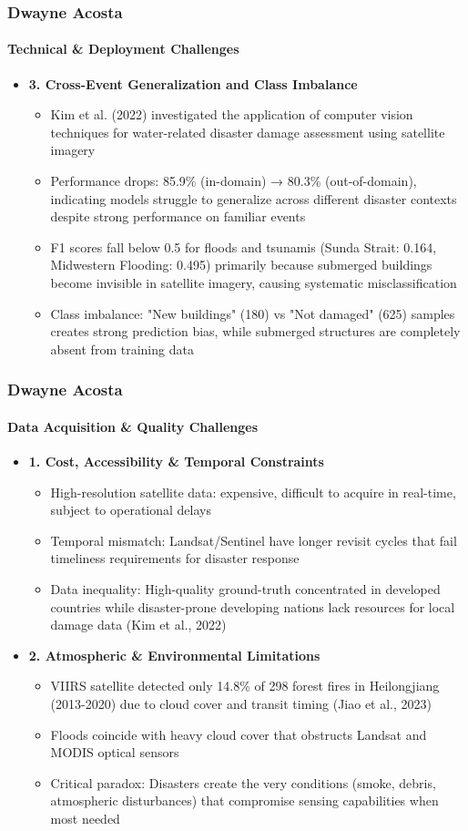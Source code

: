 \documentclass{beamer}
\newcommand{\namedframe}[3]{
  \begin{frame}
    \frametitle{#1}
    \framesubtitle{#2}
    #3
  \end{frame}
}
\begin{document}
\namedframe{Dwayne Acosta}{Technical \& Deployment Challenges}{
\begin{itemize}
    \item \textbf{3. Cross-Event Generalization and Class Imbalance}
    \begin{itemize}
      \item Kim et al. (2022) investigated the application of computer vision techniques for water-related disaster damage assessment using satellite imagery
      \item Performance drops: 85.9\% (in-domain) → 80.3\% (out-of-domain), indicating models struggle to generalize across different disaster contexts despite strong performance on familiar events
      \item F1 scores fall below 0.5 for floods and tsunamis (Sunda Strait: 0.164, Midwestern Flooding: 0.495) primarily because submerged buildings become invisible in satellite imagery, causing systematic misclassification
      \item Class imbalance: "New buildings" (180) vs "Not damaged" (625) samples creates strong prediction bias, while submerged structures are completely absent from training data
    \end{itemize}
\end{itemize}
}


\namedframe{Dwayne Acosta}{Data Acquisition \& Quality Challenges}{
\begin{itemize}
    \item \textbf{1. Cost, Accessibility \& Temporal Constraints}
    \begin{itemize}
        \item High-resolution satellite data: expensive, difficult to acquire in real-time, subject to operational delays
        \item Temporal mismatch: Landsat/Sentinel have longer revisit cycles that fail timeliness requirements for disaster response
        \item Data inequality: High-quality ground-truth concentrated in developed countries while disaster-prone developing nations lack resources for local damage data (Kim et al., 2022)
    \end{itemize}
    
    \item \textbf{2. Atmospheric \& Environmental Limitations}
    \begin{itemize}
        \item VIIRS satellite detected only 14.8\% of 298 forest fires in Heilongjiang (2013-2020) due to cloud cover and transit timing (Jiao et al., 2023)
        \item Floods coincide with heavy cloud cover that obstructs Landsat and MODIS optical sensors
        \item Critical paradox: Disasters create the very conditions (smoke, debris, atmospheric disturbances) that compromise sensing capabilities when most needed
    \end{itemize}
\end{itemize}
}
\end{document}
